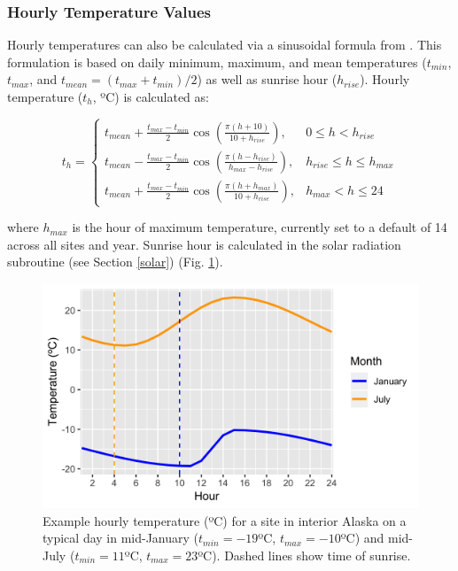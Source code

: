 \documentclass[a4paper, 12pt] {report}
\begin{document}
\subsubsection{Hourly Temperature Values}
Hourly temperatures can also be calculated via a sinusoidal formula from . This formulation is based on daily minimum, maximum, and mean temperatures ($t_{min}$, $t_{max}$, and $t_{mean} = (t_{max} + t_{min})/2$) as well as sunrise hour ($h_{rise}$). Hourly temperature ($t_h$, ºC) is calculated as:

\begin{equation}\label{hourlytemp}
t_h=\begin{cases}
	t_{mean} + \frac{t_{max} - t_{min}}{2}\cos{(\frac{\pi (h + 10)}{10 + h_{rise}})}, & \text{$0 \leq h < h_{rise}$} \\
	t_{mean} -  \frac{t_{max} - t_{min}}{2}\cos{(\frac{\pi (h - h_{rise})}{h_{max} - h_{rise}})}, & \text{$h_{rise} \leq h \leq h_{max}$} \\
	t_{mean} + \frac{t_{max} - t_{min}}{2}\cos{(\frac{\pi (h + h_{max})}{10 + h_{rise}})}, & \text{$h_{max} < h \leq 24$}
  \end{cases}
\end{equation}

where $h_{max}$ is the hour of maximum temperature, currently set to a default of 14 across all sites and year. Sunrise hour is calculated in the solar radiation subroutine (see Section \ref{solar}) (Fig. \ref{fig:htemp}).

\begin{figure}
  \includegraphics[width=0.8\linewidth]{Figures/HourlyTemp.png}
  \caption{Example hourly temperature (ºC) for a site in interior Alaska on a typical day in mid-January ($t_{min} = -19$ºC, $t_{max} = -10$ºC) and mid-July ($t_{min} = 11$ºC, $t_{max} = 23$ºC). Dashed lines show time of sunrise.}
  \label{fig:htemp}
\end{figure}
\end{document}

